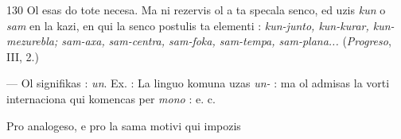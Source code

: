 \begin{VUpage}[134]{130}
Ol esas do tote necesa. Ma ni rezervis ol a ta specala senco,\nl
ed uzis \textit{kun} o \textit{sam} en la kazi, en qui la senco postulis ta\nl
elementi : \textit{kun-junto, kun-kurar, kun-mezurebla; sam-axa,}\nl
\textit{sam-centra, sam-foka, sam-tempa, sam-plana...} (\textit{Progreso},\nl
III, 2.)

 --- Ol signifikas : \textit{un}. Ex. : \cc
{} La linguo komuna uzas \textit{un-} : \nl
{} ma ol admisas la vorti internaciona qui\nl
komencas per \textit{mono} :  e. c.

Pro analogeso, e pro la sama motivi qui impozis \parplein
\end{VUpage}

